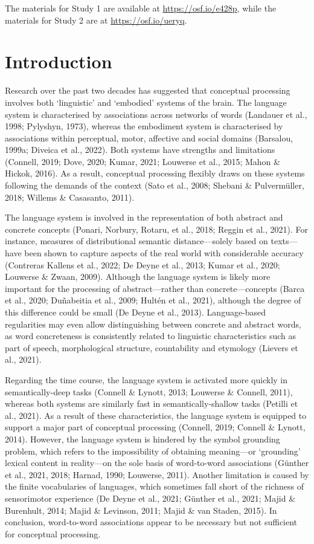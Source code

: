 \documentclass[
  12pt,
  man,floatsintext]{apa7}
\begin{document}
The materials for Study 1 are available at \url{https://osf.io/e428p}, while the materials for Study 2 are at \url{https://osf.io/ueryq}.

\newpage

\hypertarget{introduction}{%
\section{Introduction}\label{introduction}}

Research over the past two decades has suggested that conceptual processing involves both `linguistic' and `embodied' systems of the brain. The language system is characterised by associations across networks of words (Landauer et al., 1998; Pylyshyn, 1973), whereas the embodiment system is characterised by associations within perceptual, motor, affective and social domains (Barsalou, 1999a; Diveica et al., 2022). Both systems have strengths and limitations (Connell, 2019; Dove, 2020; Kumar, 2021; Louwerse et al., 2015; Mahon \& Hickok, 2016). As a result, conceptual processing flexibly draws on these systems following the demands of the context (Sato et al., 2008; Shebani \& Pulvermüller, 2018; Willems \& Casasanto, 2011).

The language system is involved in the representation of both abstract and concrete concepts (Ponari, Norbury, Rotaru, et al., 2018; Reggin et al., 2021). For instance, measures of distributional semantic distance---solely based on texts---have been shown to capture aspects of the real world with considerable accuracy (Contreras Kallens et al., 2022; De Deyne et al., 2013; Kumar et al., 2020; Louwerse \& Zwaan, 2009). Although the language system is likely more important for the processing of abstract---rather than concrete---concepts (Barca et al., 2020; Duñabeitia et al., 2009; Hultén et al., 2021), although the degree of this difference could be small (De Deyne et al., 2013). Language-based regularities may even allow distinguishing between concrete and abstract words, as word concreteness is consistently related to linguistic characteristics such as part of speech, morphological structure, countability and etymology (Lievers et al., 2021).

Regarding the time course, the language system is activated more quickly in semantically-deep tasks (Connell \& Lynott, 2013; Louwerse \& Connell, 2011), whereas both systems are similarly fast in semantically-shallow tasks (Petilli et al., 2021). As a result of these characteristics, the language system is equipped to support a major part of conceptual processing (Connell, 2019; Connell \& Lynott, 2014). However, the language system is hindered by the symbol grounding problem, which refers to the impossibility of obtaining meaning---or `grounding' lexical content in reality---on the sole basis of word-to-word associations (Günther et al., 2021, 2018; Harnad, 1990; Louwerse, 2011). Another limitation is caused by the finite vocabularies of languages, which sometimes fall short of the richness of sensorimotor experience (De Deyne et al., 2021; Günther et al., 2021; Majid \& Burenhult, 2014; Majid \& Levinson, 2011; Majid \& van Staden, 2015). In conclusion, word-to-word associations appear to be necessary but not sufficient for conceptual processing.
\end{document}
